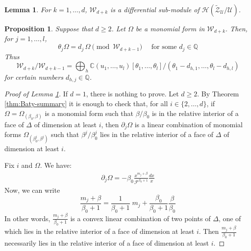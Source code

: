 \documentclass[11pt, reqno]{amsart}
\theoremstyle{plain}
\newtheorem{lem}[thm]{Lemma}
\newtheorem{prop}[thm]{Proposition}
\theoremstyle{definition}
\newcommand{\CC}{\mathbb{C}}
\newcommand{\QQ}{\mathbb{Q}}
\begin{document}
\begin{lem}\label{lem:weight-submodule-general}
    For $k=1, \dots, d$, $\mathscr{W}_{d+k}$  is a differential sub-module of $\mathcal{H}(\widetilde{\mathcal{Z}}_\mathcal{U}/\mathcal{U})$.
\end{lem}

\begin{prop}\label{lem:quotients-Gm-general}
Suppose that $d \geq 2$.  Let $\Omega$ be a monomial form in $\mathscr{W}_{d+k}$. Then, for $j=1, \dots ,l$,
\[
\theta_j\Omega = d_{j} \, \Omega \pmod{\mathscr{W}_{d+k-1}} \quad \text{ for some $d_{j} \in \QQ$}
\]
Thus
\begin{equation} \label{eq:W-decomposition-u}
     \mathscr{W}_{d+k}/\mathscr{W}_{d+k-1} = \bigoplus_{h} \CC(u_1, \dots, u_l)[\theta_1, \dots, \theta_l]/(\theta_1-d_{h,1}, \dots, \theta_l-d_{h,l})
\end{equation}
for certain numbers $d_{h,j} \in \QQ$.
\end{prop}

\begin{proof}[Proof of Lemma \ref{lem:weight-submodule-general}] If $d=1$, there is nothing to prove. Let $d \geq 2$. 
By Theorem \ref{thm:Baty-summary} it is enough to check that, for all  $i \in \{2, \dots, d\}$, if $\Omega=\Omega_{(\beta_0, \beta)} $ is a monomial form such that
$\beta/\beta_0$ is in the relative interior of a face of $\Delta$ of dimension at least $i$, then $
\partial_j\Omega$ 
is a linear combination of monomial forms $\Omega_{(\beta^j_0, \beta^j)}$ such that $\beta^j/\beta^j_0$ lies in the relative interior of a face of $\Delta$ of dimension at least $i$. 

Fix $i$ and $\Omega$.
We have:
\begin{align*}
\partial_j \Omega =   -\beta_0  \frac{x^{m_{j}+\beta} }{\mathcal{F}^{\beta_0+1}}   \frac{dx}{x}
\end{align*}
Now, we can write
\[
\frac{m_{j}+\beta}{\beta_0+1} =\frac{1}{\beta_0+1} \; m_{j} + \frac{\beta_0}{\beta_0+1}\frac{\beta}{\beta_0}
\]
In other words, $\frac{m_{j}+\beta}{\beta_0+1}$ is a convex linear combination of two points of $\Delta$,  one of which lies in the relative interior of a face of dimension at least $i$. 
Then $\frac{m_{j}+\beta}{\beta_0+1}$ necessarily lies in the relative interior of a face of dimension at least $i$. 
\end{proof}
\end{document}
